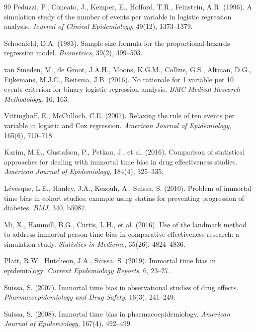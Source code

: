 \documentclass[11pt,a4paper]{article}
\begin{document}
\begin{thebibliography}{99}
Peduzzi, P., Concato, J., Kemper, E., Holford, T.R., Feinstein, A.R. (1996).
A simulation study of the number of events per variable in logistic regression
analysis.
\textit{Journal of Clinical Epidemiology}, 49(12), 1373--1379.

Schoenfeld, D.A. (1983).
Sample-size formula for the proportional-hazards regression model.
\textit{Biometrics}, 39(2), 499--503.

van Smeden, M., de Groot, J.A.H., Moons, K.G.M., Collins, G.S., Altman, D.G.,
Eijkemans, M.J.C., Reitsma, J.B. (2016).
No rationale for 1 variable per 10 events criterion for binary logistic
regression analysis.
\textit{BMC Medical Research Methodology}, 16, 163.

Vittinghoff, E., McCulloch, C.E. (2007).
Relaxing the rule of ten events per variable in logistic and Cox regression.
\textit{American Journal of Epidemiology}, 165(6), 710--718.


Karim, M.E., Gustafson, P., Petkau, J., et al. (2016).
Comparison of statistical approaches for dealing with immortal time bias in
drug effectiveness studies.
\textit{American Journal of Epidemiology}, 184(4), 325--335.

L\'evesque, L.E., Hanley, J.A., Kezouh, A., Suissa, S. (2010).
Problem of immortal time bias in cohort studies: example using statins for
preventing progression of diabetes.
\textit{BMJ}, 340, b5087.

Mi, X., Hammill, B.G., Curtis, L.H., et al. (2016).
Use of the landmark method to address immortal person-time bias in comparative
effectiveness research: a simulation study.
\textit{Statistics in Medicine}, 35(26), 4824--4836.

Platt, R.W., Hutcheon, J.A., Suissa, S. (2019).
Immortal time bias in epidemiology.
\textit{Current Epidemiology Reports}, 6, 23--27.

Suissa, S. (2007).
Immortal time bias in observational studies of drug effects.
\textit{Pharmacoepidemiology and Drug Safety}, 16(3), 241--249.

Suissa, S. (2008).
Immortal time bias in pharmacoepidemiology.
\textit{American Journal of Epidemiology}, 167(4), 492--499.


\end{thebibliography}
\end{document}
